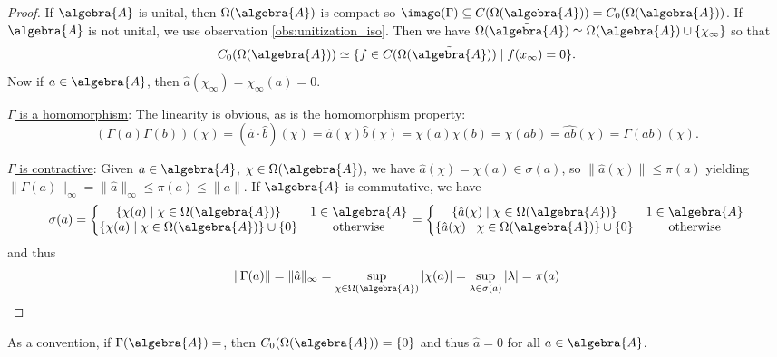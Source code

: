 \documentclass[a4paper]{article}
\begin{document}
\begin{proof}
	If $\algebra{A}$ is unital, then $\Omega(\algebra{A})$ is compact so $\image(\Gamma) \subseteq C(\Omega(\algebra{A})) = C_0(\Omega(\algebra{A}))$. If $\algebra{A}$ is not unital, we use observation \ref{obs:unitization_iso}. Then we have $\Omega(\tilde{\algebra{A}}) \simeq \Omega(\algebra{A}) \cup \{\chi_\infty\}$ so that
	\begin{equation*}
		C_0(\Omega(\algebra{A})) \simeq \{ f \in C(\Omega(\tilde{\algebra{A}})) \mid f(x_\infty) = 0 \}\text{.}
	\end{equation*}
	Now if $a \in \algebra{A}$, then $\hat a (\chi_\infty) = \chi_\infty(a) = 0$.

	\underline{$\Gamma$ is a homomorphism}: The linearity is obvious, as is the homomorphism property:
	\begin{equation*}
		(\Gamma(a) \Gamma(b))(\chi) = (\hat a \cdot \hat b)(\chi) = \hat a(\chi) \hat b (\chi) = \chi(a) \chi(b) = \chi(ab) = \hat{ab} (\chi) = \Gamma(ab)(\chi)\text{.}
	\end{equation*}

	\underline{$\Gamma$ is contractive}: Given $a \in \algebra{A}$, $\chi \in \Omega(\algebra{A})$, we have $\hat a (\chi) = \chi(a) \in \sigma(a)$, so $\|\hat a (\chi) \| \leq \pi(a)$ yielding $\|\Gamma(a)\|_\infty = \|\hat a\|_\infty \leq \pi(a) \leq \|a\|$. If $\algebra{A}$ is commutative, we have 
	\begin{equation*}
		\sigma(a) = \left\{ \begin{matrix}
			\{\chi(a) \mid \chi \in \Omega(\algebra{A}) \} & 1 \in \algebra{A}\\
			\{\chi(a) \mid \chi \in \Omega(\algebra{A}) \} \cup \{0 \} & \text{otherwise}
		\end{matrix} \right. = \left\{ \begin{matrix}
			\{ \hat a(\chi) \mid \chi \in \Omega(\algebra{A}) \} & 1 \in \algebra{A} \\
			\{ \hat a(\chi) \mid \chi \in \Omega(\algebra{A}) \} \cup \{0\} & \text{otherwise}
		\end{matrix} \right.
	\end{equation*}
	and thus 
	\begin{equation*}
		\|\Gamma(a)\| = \|\hat a \|_\infty = \sup_{\chi \in \Omega(\algebra{A})} | \chi(a) | = \sup_{\lambda \in \sigma(a)} |\lambda| = \pi(a)
	\end{equation*}
\end{proof}

As a convention, if $\Gamma(\algebra{A}) = \empty$, then $C_0(\Omega(\algebra{A})) = \{0\}$ and thus $\hat a = 0$ for all $a \in \algebra{A}$.
\end{document}
